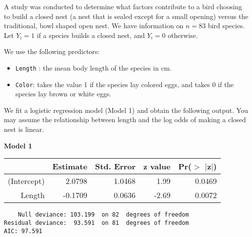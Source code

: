 \documentclass[11pt]{article}
\begin{document}
A study was conducted to determine what factors contribute to a bird choosing to build a closed nest (a nest that is sealed except for a small opening) versus the traditional, bowl shaped open nest. We have information on $n = 83$ bird species. Let $Y_i = 1$ if a species builds a closed nest, and $Y_i = 0$ otherwise. 

We use the following predictors:
\begin{itemize}
\item \texttt{Length} : the mean body length of the species in cm. 
\item \texttt{Color}: takes the value 1 if the species lay colored eggs, and takes 0 if the species lay brown or white eggs. 
\end{itemize}

We fit a logistic regression model (Model 1) and obtain the following output. You may assume the relationship between length and the log odds of making a closed nest is linear. 

\textbf{Model 1} 

\begin{table}[ht]
\centering
\begin{tabular}{rrrrr}
  \hline
 & Estimate & Std. Error & z value & Pr($>$ $|$z$|$) \\ 
  \hline
(Intercept) & 2.0798 & 1.0468 & 1.99 & 0.0469 \\ 
  Length & -0.1709 & 0.0636 & -2.69 & 0.0072 \\ 
   \hline
\end{tabular}
\end{table}

\begin{verbatim}
    Null deviance: 103.199  on 82  degrees of freedom
Residual deviance:  93.591  on 81  degrees of freedom
AIC: 97.591
\end{verbatim}
\end{document}
